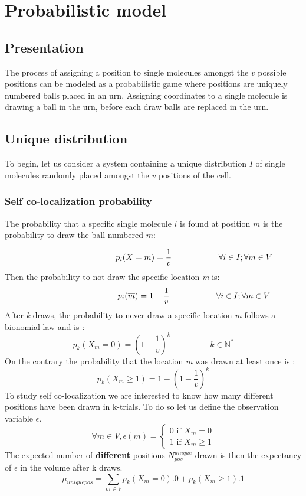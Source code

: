 \documentclass{article}
\begin{document}
\newpage
\section{Probabilistic model}

\subsection{Presentation}
The process of assigning a position to single molecules amongst the $v$ possible positions can be modeled as a probabilistic game where
positions are uniquely numbered balls placed in an urn. Assigning coordinates to a single molecule is drawing a ball in the urn,
before each draw balls are replaced in the urn.
\subsection{Unique distribution}
To begin, let us consider a system containing a unique distribution $I$ of single molecules randomly placed amongst the $v$ positions of the cell.

\subsubsection{Self co-localization probability}
The probability that a specific single molecule $i$ is found at position $m$ is the probability to draw the ball numbered
$m$:

\[
    \hspace{3.5cm} p_i(X=m) = \frac{1}{v} \hspace{2cm} \forall  i \in I; \forall m \in V
\]
Then the probability to not draw the specific location \textit{m} is:
\[
    \hspace{3.5cm} p_i(\overline{m}) = 1-\frac{1}{v} \hspace{2cm} \forall  i \in I; \forall m \in V
\]
After \textit{k} draws, the probability to never draw a specific location \textit{m} follows a bionomial law and is :
\[
p_k(X_m = 0) = (1 - \frac{1}{v})^k \hspace{2cm} k \in \mathbb{N^*}
\]
On the contrary the probability that the location \textit{m} was drawn at least once is :
\begin{equation}
p_k(X_m \geq 1) = 1-(1 - \frac{1}{v})^k
\end{equation}
To study self co-localization we are interested to know how many different positions have been drawn in k-trials. To do so let us 
define the observation variable $\epsilon$.
\[
\forall m \in V, \epsilon (m) = \begin{cases}
    0 \text{ if } X_m = 0 \\
    1 \text{ if } X_m \geq 1
\end{cases}
\]
The expected number of \textbf{different} positions $ N^{unique}_{pos} $ drawn is then the expectancy of $ \epsilon $ in the volume after k draws.
\[
    \mu_{uniquepos} = \sum_{m \in V}p_k(X_m = 0).0 + p_k(X_m \geq 1).1
\]
\end{document}
